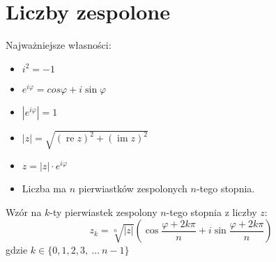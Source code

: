 \section*{Liczby zespolone}

Najważniejsze własności:

\begin{itemize}
    \item $i^2 = -1$
    \item $e^{i\varphi} = cos{\varphi} + i\sin{\varphi}$
    \item $|e^{i\varphi}| = 1$
    \item $|z| = \sqrt{(\operatorname{re}{z})^2 +
    (\operatorname{im}{z})^2}$
    \item $z = |z|\cdot e^{i\varphi}$
    \item Liczba ma $n$ pierwiastków zespolonych $n$-tego stopnia.
\end{itemize}
Wzór na $k$-ty pierwiastek zespolony $n$-tego stopnia z liczby $z$:
\begin{equation*}
    z_k = \sqrt[n]{|z|}
    \left(
    \cos{\frac{\varphi + 2k\pi}{n}}
    + i\sin{\frac{\varphi + 2k\pi}{n}}
    \right)
\end{equation*}
gdzie
$k \in \{0, 1, 2, 3, \ \hdots\ n - 1\}$